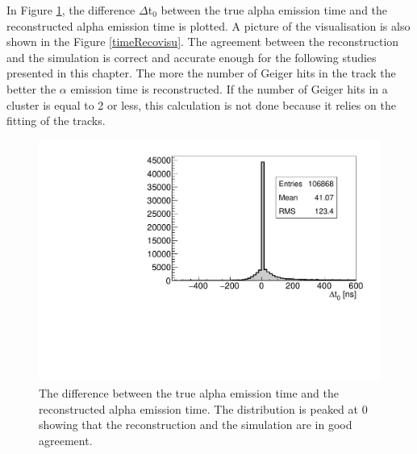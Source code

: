 \documentclass[main.tex]{subfiles}
\begin{document}
\noindent In Figure \ref{timeReco}, the difference $\Delta$t$_\text{0}$ between the true alpha emission time and the reconstructed alpha emission time is plotted. A picture of the visualisation is also shown in the Figure \ref{timeRecovisu}. The agreement between the reconstruction and the simulation is correct and accurate enough for the following studies presented in this chapter. The more the number of Geiger hits in the track the better the $\alpha$ emission time is reconstructed. If the number of Geiger hits in a cluster is equal to 2 or less, this calculation is not done because it relies on the fitting of the tracks. 


\begin{figure}[h!]
\begin{center}
\includegraphics[scale=0.55]{pictures/Chap5/delta_time_simu_reco.pdf}
\caption{The difference between the true alpha emission time and the reconstructed alpha emission time. The distribution is peaked at 0 showing that the reconstruction and the simulation are in good agreement.}
\label{timeReco}
\end{center}
\end{figure}
\end{document}
